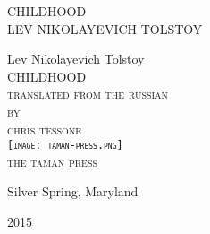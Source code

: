 \newlength{\drop}\setlength{\drop}{0.12\textheight}

\newcommand*{\firsttitle}{\begingroup
\centering
\vspace*{3em}
{\Large CHILDHOOD}\\[\baselineskip]
{\Large LEV NIKOLAYEVICH TOLSTOY}
\vfill\null
\endgroup}

\newcommand*{\titleAM}{\begingroup
\centering
\vspace*{\drop}
{\large Lev Nikolayevich Tolstoy}\\[\baselineskip]
{\Huge CHILDHOOD}\\[\baselineskip]
{\scshape translated from the russian}\\
{\scshape by}\\
{\scshape chris tessone}\\
\vfill%
{\scshape \texttt{[image: taman-press.png]}}\\[0.5\baselineskip]
{\small\scshape the taman press}\par
{\small Silver Spring, Maryland}\par
{\small\scshape 2015}\par
\endgroup}

\firsttitle
\thispagestyle{empty}
\clearpage

\newpage\null\thispagestyle{empty}\newpage

\titleAM
\thispagestyle{empty}
\clearpage 
